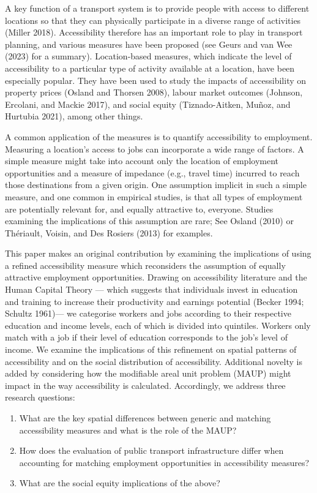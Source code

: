 \documentclass{article}
\providecommand{\tightlist}{%
  \setlength{\itemsep}{0pt}\setlength{\parskip}{0pt}}
\begin{document}
A key function of a transport system is to provide people with access to
different locations so that they can physically participate in a diverse
range of activities (Miller 2018). Accessibility therefore has an
important role to play in transport planning, and various measures have
been proposed (see Geurs and van Wee (2023) for a summary).
Location-based measures, which indicate the level of accessibility to a
particular type of activity available at a location, have been
especially popular. They have been used to study the impacts of
accessibility on property prices (Osland and Thorsen 2008), labour
market outcomes (Johnson, Ercolani, and Mackie 2017), and social equity
(Tiznado-Aitken, Muñoz, and Hurtubia 2021), among other things.

A common application of the measures is to quantify accessibility to
employment. Measuring a location's access to jobs can incorporate a wide
range of factors. A simple measure might take into account only the
location of employment opportunities and a measure of impedance (e.g.,
travel time) incurred to reach those destinations from a given origin.
One assumption implicit in such a simple measure, and one common in
empirical studies, is that all types of employment are potentially
relevant for, and equally attractive to, everyone. Studies examining the
implications of this assumption are rare; See Osland (2010) or
Thériault, Voisin, and Des Rosiers (2013) for examples.

This paper makes an original contribution by examining the implications
of using a refined accessibility measure which reconsiders the
assumption of equally attractive employment opportunities. Drawing on
accessibility literature and the Human Capital Theory --- which suggests
that individuals invest in education and training to increase their
productivity and earnings potential (Becker 1994; Schultz 1961)--- we
categorise workers and jobs according to their respective education and
income levels, each of which is divided into quintiles. Workers only
match with a job if their level of education corresponds to the job's
level of income. We examine the implications of this refinement on
spatial patterns of accessibility and on the social distribution of
accessibility. Additional novelty is added by considering how the
modifiable areal unit problem (MAUP) might impact in the way
accessibility is calculated. Accordingly, we address three research
questions:

\begin{enumerate}
\def\labelenumi{\arabic{enumi}.}
\tightlist
\item
  What are the key spatial differences between generic and matching
  accessibility measures and what is the role of the MAUP?
\item
  How does the evaluation of public transport infrastructure differ when
  accounting for matching employment opportunities in accessibility
  measures?
\item
  What are the social equity implications of the above?
\end{enumerate}
\end{document}
